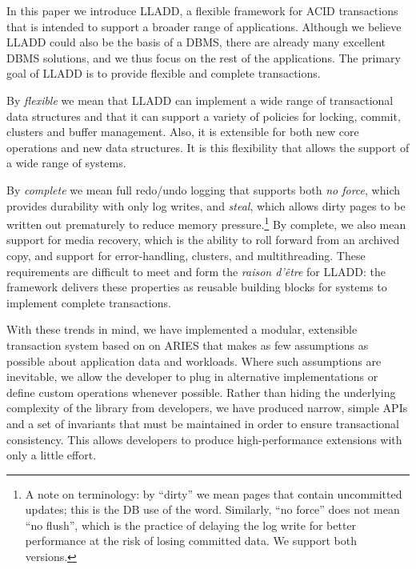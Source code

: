 \documentclass[10pt,letterpaper,twocolumn,english]{article}
\newcommand{\yad}{LLADD\xspace}
\begin{document}
In this paper we introduce \yad, a flexible framework for ACID
transactions that is intended to support a broader range of
applications.  Although we believe \yad could also be the basis of a
DBMS, there are already many excellent DBMS solutions, and we thus
focus on the rest of the applications.  The primary goal of \yad is to
provide flexible and complete transactions.

By {\em flexible} we mean that \yad can implement a wide range of
transactional data structures and that it can support a variety of
policies for locking, commit, clusters and buffer management. Also,
it is extensible for both new core operations and new data
structures.  It is this flexibility that allows the support of a wide
range of systems.

By {\em complete} we mean full redo/undo logging that supports both
{\em no force}, which provides durability with only log writes, and
{\em steal}, which allows dirty pages to be written out prematurely to
reduce memory pressure.\footnote{A note on terminology: by ``dirty''
we mean pages that contain uncommitted updates; this is the DB use of
the word. Similarly, ``no force'' does not mean ``no flush'', which is
the practice of delaying the log write for better performance at the
risk of losing committed data. We support both versions.} By complete,
we also mean support for media recovery, which is the ability to roll
forward from an archived copy, and support for error-handling,
clusters, and multithreading.  These requirements are difficult to
meet and form the {\em raison d'\^{e}tre} for \yad: the framework delivers
these properties as reusable building blocks for systems to implement 
complete transactions.

With these trends in mind, we have implemented a modular, extensible
transaction system based on on ARIES that makes as few assumptions as
possible about application data and workloads. Where such
assumptions are inevitable, we allow 
the developer to plug in alternative implementations or
define custom operations whenever possible. Rather than hiding the underlying complexity
of the library from developers, we have produced narrow, simple APIs
and a set of invariants that must be maintained in order to ensure
transactional consistency.  This allows developers to produce
high-performance extensions with only a little effort.  
\end{document}
